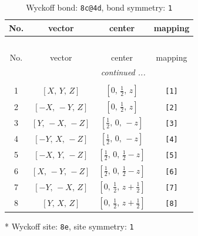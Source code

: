 \documentclass[fleqn,8pt]{jsarticle}
\begin{document}
\renewcommand{\arraystretch}{1.2}
\begin{longtable}{cccc}
\caption{Wyckoff bond: {\tt 8c@4d}, bond symmetry: {\tt 1}}
 \\
 \hline \hline
No. & vector & center & mapping \\ \hline \endfirsthead

\multicolumn{3}{l}{\tablename\ \thetable{}} \\
 \hline \hline
No. & vector & center & mapping \\ \hline \endhead

 \hline \hline
\multicolumn{3}{r}{\footnotesize\it continued ...} \\ \endfoot

 \hline \hline
\multicolumn{3}{r}{} \\ \endlastfoot

1 & $\left[ X,\, Y,\, Z \right]$ & $\left[ 0,\, \frac{1}{2},\, z \right]$ & {\tt [1]} \\ \hline
2 & $\left[ - X,\, - Y,\, Z \right]$ & $\left[ 0,\, \frac{1}{2},\, z \right]$ & {\tt [2]} \\ \hline
3 & $\left[ Y,\, - X,\, - Z \right]$ & $\left[ \frac{1}{2},\, 0,\, - z \right]$ & {\tt [3]} \\ \hline
4 & $\left[ - Y,\, X,\, - Z \right]$ & $\left[ \frac{1}{2},\, 0,\, - z \right]$ & {\tt [4]} \\ \hline
5 & $\left[ - X,\, Y,\, - Z \right]$ & $\left[ \frac{1}{2},\, 0,\, \frac{1}{2} - z \right]$ & {\tt [5]} \\ \hline
6 & $\left[ X,\, - Y,\, - Z \right]$ & $\left[ \frac{1}{2},\, 0,\, \frac{1}{2} - z \right]$ & {\tt [6]} \\ \hline
7 & $\left[ - Y,\, - X,\, Z \right]$ & $\left[ 0,\, \frac{1}{2},\, z + \frac{1}{2} \right]$ & {\tt [7]} \\ \hline
8 & $\left[ Y,\, X,\, Z \right]$ & $\left[ 0,\, \frac{1}{2},\, z + \frac{1}{2} \right]$ & {\tt [8]} \\
\end{longtable}
* Wyckoff site: {\tt 8e}, site symmetry: {\tt 1}
\renewcommand{\arraystretch}{1.2}
\end{document}
